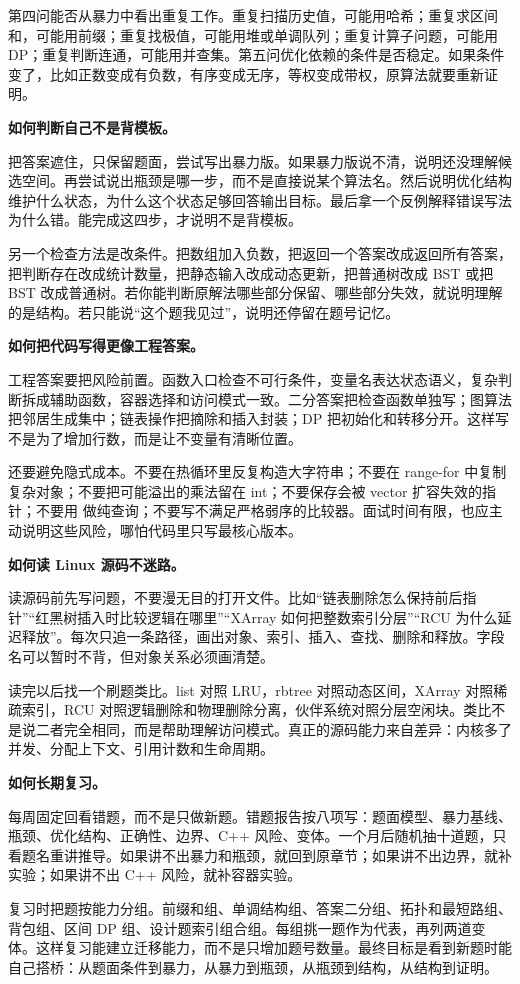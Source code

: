 第四问能否从暴力中看出重复工作。重复扫描历史值，可能用哈希；重复求区间和，可能用前缀；重复找极值，可能用堆或单调队列；重复计算子问题，可能用 DP；重复判断连通，可能用并查集。第五问优化依赖的条件是否稳定。如果条件变了，比如正数变成有负数，有序变成无序，等权变成带权，原算法就要重新证明。

\noindent\textbf{如何判断自己不是背模板。}

把答案遮住，只保留题面，尝试写出暴力版。如果暴力版说不清，说明还没理解候选空间。再尝试说出瓶颈是哪一步，而不是直接说某个算法名。然后说明优化结构维护什么状态，为什么这个状态足够回答输出目标。最后拿一个反例解释错误写法为什么错。能完成这四步，才说明不是背模板。

另一个检查方法是改条件。把数组加入负数，把返回一个答案改成返回所有答案，把判断存在改成统计数量，把静态输入改成动态更新，把普通树改成 BST 或把 BST 改成普通树。若你能判断原解法哪些部分保留、哪些部分失效，就说明理解的是结构。若只能说“这个题我见过”，说明还停留在题号记忆。

\noindent\textbf{如何把代码写得更像工程答案。}

工程答案要把风险前置。函数入口检查不可行条件，变量名表达状态语义，复杂判断拆成辅助函数，容器选择和访问模式一致。二分答案把检查函数单独写；图算法把邻居生成集中；链表操作把摘除和插入封装；DP 把初始化和转移分开。这样写不是为了增加行数，而是让不变量有清晰位置。

还要避免隐式成本。不要在热循环里反复构造大字符串；不要在 range-for 中复制复杂对象；不要把可能溢出的乘法留在 int；不要保存会被 vector 扩容失效的指针；不要用  做纯查询；不要写不满足严格弱序的比较器。面试时间有限，也应主动说明这些风险，哪怕代码里只写最核心版本。

\noindent\textbf{如何读 Linux 源码不迷路。}

读源码前先写问题，不要漫无目的打开文件。比如“链表删除怎么保持前后指针”“红黑树插入时比较逻辑在哪里”“XArray 如何把整数索引分层”“RCU 为什么延迟释放”。每次只追一条路径，画出对象、索引、插入、查找、删除和释放。字段名可以暂时不背，但对象关系必须画清楚。

读完以后找一个刷题类比。list 对照 LRU，rbtree 对照动态区间，XArray 对照稀疏索引，RCU 对照逻辑删除和物理删除分离，伙伴系统对照分层空闲块。类比不是说二者完全相同，而是帮助理解访问模式。真正的源码能力来自差异：内核多了并发、分配上下文、引用计数和生命周期。

\noindent\textbf{如何长期复习。}

每周固定回看错题，而不是只做新题。错题报告按八项写：题面模型、暴力基线、瓶颈、优化结构、正确性、边界、C++ 风险、变体。一个月后随机抽十道题，只看题名重讲推导。如果讲不出暴力和瓶颈，就回到原章节；如果讲不出边界，就补实验；如果讲不出 C++ 风险，就补容器实验。

复习时把题按能力分组。前缀和组、单调结构组、答案二分组、拓扑和最短路组、背包组、区间 DP 组、设计题索引组合组。每组挑一题作为代表，再列两道变体。这样复习能建立迁移能力，而不是只增加题号数量。最终目标是看到新题时能自己搭桥：从题面条件到暴力，从暴力到瓶颈，从瓶颈到结构，从结构到证明。

